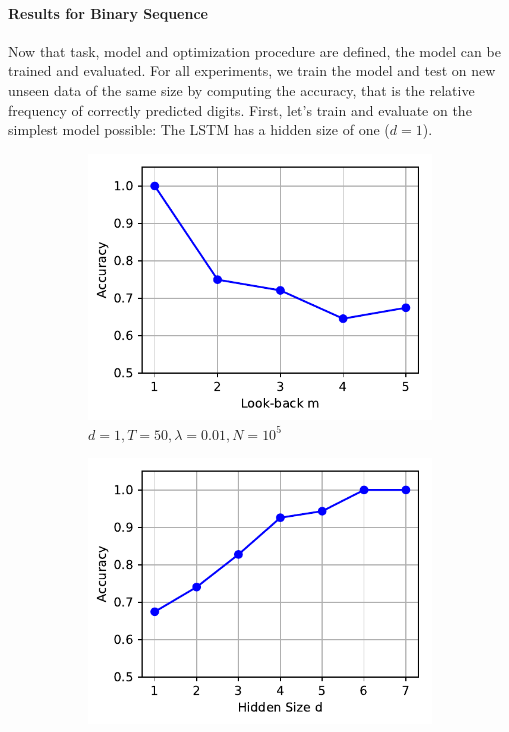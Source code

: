 		\paragraph{Results for Binary Sequence}
		Now that task, model and optimization procedure are defined, the model can be trained and evaluated.
		For all experiments, we train the model and test on new unseen data of the same size by computing the accuracy, that is the relative frequency of correctly predicted digits.
		First, let's train and evaluate on the simplest model possible: The LSTM has a hidden size of one ($d = 1$).
		\begin{figure}[tb]
			\centering
			\begin{subfigure}[b]{0.5\linewidth}
				\centering
				\includegraphics[width=\linewidth]{Images/Python-Plots/memory/accuracy-vs-look-back}
				\caption{
					$d = 1, T = 50, \lambda = 0.01, N = 10^5$
					\label{fig:accuracy-vs-look-back}
				}
			\end{subfigure}%
			\begin{subfigure}[b]{0.5\linewidth}
				\includegraphics[width=\linewidth]{Images/Python-Plots/memory/accuracy-vs-hidden-size}

\end{subfigure}
\end{figure}
